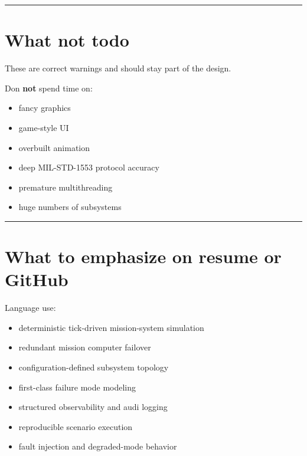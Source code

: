 \documentclass{report}
\begin{document}
\begin{center}
\rule{0.9\textwidth}{1pt}
\end{center}
\section{What not todo}

These are correct warnings and should stay part of the design.

Don \textbf{not} spend time on:
\begin{itemize}
   \item fancy graphics
   \item game-style UI
   \item overbuilt animation
   \item deep MIL-STD-1553 protocol accuracy
   \item premature multithreading
   \item huge numbers of subsystems
\end{itemize}

\begin{center}
\rule{0.9\textwidth}{1pt}
\end{center}
\section{What to emphasize on resume or GitHub}

Language use:
\begin{itemize}
   \item deterministic tick-driven mission-system simulation
   \item redundant mission computer failover
   \item configuration-defined subsystem topology
   \item first-class failure mode modeling
   \item structured observability and audi logging
   \item reproducible scenario execution
   \item fault injection and degraded-mode behavior
\end{itemize}
\end{document}
